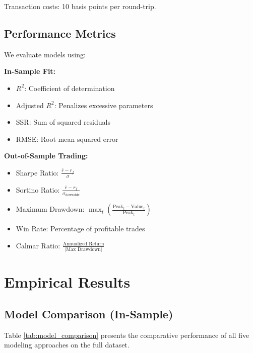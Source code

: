 \documentclass[12pt,a4paper]{article}
\begin{document}
Transaction costs: 10 basis points per round-trip.

\subsection{Performance Metrics}

We evaluate models using:

\textbf{In-Sample Fit:}
\begin{itemize}
    \item $R^2$: Coefficient of determination
    \item Adjusted $R^2$: Penalizes excessive parameters
    \item SSR: Sum of squared residuals
    \item RMSE: Root mean squared error
\end{itemize}

\textbf{Out-of-Sample Trading:}
\begin{itemize}
    \item Sharpe Ratio: $\frac{\bar{r} - r_f}{\sigma}$
    \item Sortino Ratio: $\frac{\bar{r} - r_f}{\sigma_{\text{downside}}}$
    \item Maximum Drawdown: $\max_{t} \left( \frac{\text{Peak}_t - \text{Value}_t}{\text{Peak}_t} \right)$
    \item Win Rate: Percentage of profitable trades
    \item Calmar Ratio: $\frac{\text{Annualized Return}}{|\text{Max Drawdown}|}$
\end{itemize}

\newpage
\section{Empirical Results}

\subsection{Model Comparison (In-Sample)}

Table \ref{tab:model_comparison} presents the comparative performance of all five modeling approaches on the full dataset.
\end{document}
